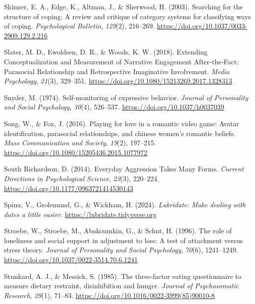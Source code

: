 \documentclass[
]{udthesis}
\newlength{\cslhangindent}
\newenvironment{CSLReferences}[2] %
 {\begin{list}{}{%
  \setlength{\itemindent}{0pt}
  \setlength{\leftmargin}{0pt}
  \setlength{\parsep}{0pt}
  \ifodd #1
   \setlength{\leftmargin}{\cslhangindent}
   \setlength{\itemindent}{-1\cslhangindent}
  \fi
  \setlength{\itemsep}{#2\baselineskip}}}
 {\end{list}}
\begin{document}
\begin{CSLReferences}{1}{0}
Skinner, E. A., Edge, K., Altman, J., \& Sherwood, H. (2003). Searching for the structure of coping: {A} review and critique of category systems for classifying ways of coping. \emph{Psychological Bulletin}, \emph{129}(2), 216--269. \url{https://doi.org/10.1037/0033-2909.129.2.216}

Slater, M. D., Ewoldsen, D. R., \& Woods, K. W. (2018). Extending {Conceptualization} and {Measurement} of {Narrative Engagement After}-the-{Fact}: {Parasocial Relationship} and {Retrospective Imaginative Involvement}. \emph{Media Psychology}, \emph{21}(3), 329--351. \url{https://doi.org/10.1080/15213269.2017.1328313}

Snyder, M. (1974). Self-monitoring of expressive behavior. \emph{Journal of Personality and Social Psychology}, \emph{30}(4), 526--537. \url{https://doi.org/10.1037/h0037039}

Song, W., \& Fox, J. (2016). Playing for love in a romantic video game: Avatar identification, parasocial relationships, and chinese women's romantic beliefs. \emph{Mass Communication and Society}, \emph{19}(2), 197--215. \url{https://doi.org/10.1080/15205436.2015.1077972}

South Richardson, D. (2014). Everyday {Aggression Takes Many Forms}. \emph{Current Directions in Psychological Science}, \emph{23}(3), 220--224. \url{https://doi.org/10.1177/0963721414530143}

Spinu, V., Grolemund, G., \& Wickham, H. (2024). \emph{Lubridate: Make dealing with dates a little easier}. \url{https://lubridate.tidyverse.org}

Stroebe, W., Stroebe, M., Abakoumkin, G., \& Schut, H. (1996). The role of loneliness and social support in adjustment to loss: {A} test of attachment versus stress theory. \emph{Journal of Personality and Social Psychology}, \emph{70}(6), 1241--1249. \url{https://doi.org/10.1037/0022-3514.70.6.1241}

Stunkard, A. J., \& Messick, S. (1985). The three-factor eating questionnaire to measure dietary restraint, disinhibition and hunger. \emph{Journal of Psychosomatic Research}, \emph{29}(1), 71--83. \url{https://doi.org/10.1016/0022-3999(85)90010-8}


\end{CSLReferences}
\end{document}

